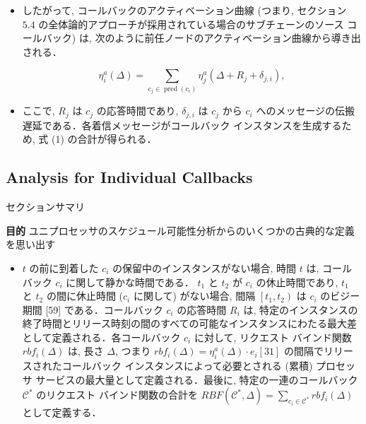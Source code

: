 \begin{frame}{}
    \begin{itemize}
        \item したがって, コールバックのアクティベーション曲線 (つまり, セクション $5.4$ の全体論的アプローチが採用されている場合のサブチェーンのソース コールバック) は, 次のように前任ノードのアクティベーション曲線から導き出される．

              \begin{equation*}
                  \eta_{i}^{a}(\Delta)=\sum_{c_{j} \in \operatorname{pred}\left(c_{i}\right)} \eta_{j}^{a}\left(\Delta+R_{j}+\delta_{j, i}\right),
              \end{equation*}

        \item ここで, $R_{j}$ は $c_{j}$ の応答時間であり, $\delta_{j, i}$ は $c_{j}$ から $c_{i}$ へのメッセージの伝搬遅延である．各着信メッセージがコールバック インスタンスを生成するため, 式 (1) の合計が得られる．
    \end{itemize}
\end{frame}


\subsection{Analysis for Individual Callbacks}
\label{ssec: analysis for individual callbacks}

\begin{frame}{セクションサマリ}
    \begin{itembox}[l]{\textbf{目的}}
        ユニプロセッサのスケジュール可能性分析からのいくつかの古典的な定義を思い出す
    \end{itembox}
\end{frame}

\begin{frame}{}
    \begin{itemize}
        \item $t$ の前に到着した $c_{i}$ の保留中のインスタンスがない場合, 時間 $t$ は, コールバック $c_{i}$ に関して静かな時間である． $t_{1}$ と $t_{2}$ が $c_{i}$ の休止時間であり, $t_{1}$ と $t_{2}$ の間に休止時間 ($c_{i}$ に関して) がない場合, 間隔 $\left[t_{1}, t_{2}\right)$ は $c_{i}$ のビジー期間 [59] である．コールバック $c_{i}$ の応答時間 $R_{i}$ は, 特定のインスタンスの終了時間とリリース時刻の間のすべての可能なインスタンスにわたる最大差として定義される．各コールバック $c_{i}$ に対して, リクエスト バインド関数 $r b f_{i}(\Delta)$ は, 長さ $\Delta$, つまり $r b f_{i}(\Delta)=\eta_{i}^{a}(\Delta) \cdot e_{i}[31]$ の間隔でリリースされたコールバック インスタンスによって必要とされる (累積) プロセッサ サービスの最大量として定義される．最後に, 特定の一連のコールバック $\mathcal{C}^{*}$ のリクエスト バインド関数の合計を $R B F\left(\mathcal{C}^{*}, \Delta\right)=\sum_{c_{i} \in \mathcal{C}^{*}} r b f_{i}(\Delta)$ として定義する．
    \end{itemize}
\end{frame}

